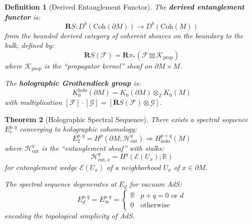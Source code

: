 \documentclass[12pt,a4paper]{article}
\newtheorem{theorem}{Theorem}[section]
\newtheorem{definition}[theorem]{Definition}
\begin{document}
\begin{definition}[Derived Entanglement Functor]\label{def:derived-ent}
The \textbf{derived entanglement functor} is:
\begin{equation}
\mathbf{R}S: D^b(\text{Coh}(\partial M)) \to D^b(\text{Coh}(M))
\end{equation}
from the bounded derived category of coherent sheaves on the boundary to the bulk, defined by:
\begin{equation}
\mathbf{R}S(\mathcal{F}) = \mathbf{R}\pi_* \left( \mathcal{F} \boxtimes \mathcal{K}_{\text{prop}} \right)
\end{equation}
where $\mathcal{K}_{\text{prop}}$ is the ``propagator kernel'' sheaf on $\partial M \times M$.

The \textbf{holographic Grothendieck group} is:
\begin{equation}
K^{\text{holo}}_0(\partial M) = K_0(\partial M) \otimes_{\mathbb{Z}} K_0(M)
\end{equation}
with multiplication $[\mathcal{F}] \cdot [\mathcal{G}] = [\mathbf{R}S(\mathcal{F}) \otimes \mathcal{G}]$.
\end{definition}

\begin{theorem}[Holographic Spectral Sequence]\label{thm:holo-spectral}
There exists a spectral sequence $E_r^{p,q}$ converging to holographic cohomology:
\begin{equation}
E_2^{p,q} = H^p(\partial M; \mathcal{H}^q_{\text{ent}}) \Rightarrow H^{p+q}_{\text{holo}}(M)
\end{equation}
where $\mathcal{H}^q_{\text{ent}}$ is the ``entanglement sheaf'' with stalks:
\begin{equation}
\mathcal{H}^q_{\text{ent},x} = H^q(\mathcal{E}(U_x); \mathbb{R})
\end{equation}
for entanglement wedge $\mathcal{E}(U_x)$ of a neighborhood $U_x$ of $x \in \partial M$.

The spectral sequence degenerates at $E_d$ for vacuum AdS:
\begin{equation}
E_d^{p,q} = E_\infty^{p,q} = \begin{cases}
\mathbb{R} & p + q = 0 \text{ or } d \\
0 & \text{otherwise}
\end{cases}
\end{equation}
encoding the topological simplicity of AdS.
\end{theorem}
\end{document}
